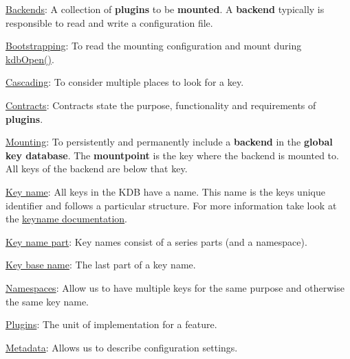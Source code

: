 \begin{DoxyItemize}
\item \hyperlink{doc_help_elektra-backends_md}{Backends}\+: A collection of {\bfseries plugins} to be {\bfseries mounted}. A {\bfseries backend} typically is responsible to read and write a configuration file.
\item \hyperlink{doc_help_elektra-bootstrapping_md}{Bootstrapping}\+: To read the mounting configuration and mount during {\ttfamily \hyperlink{group__kdb_ga844e1299a84c3fbf1d3a905c5c893ba5}{kdb\+Open()}}.
\item \hyperlink{doc_help_elektra-cascading_md}{Cascading}\+: To consider multiple places to look for a key.
\item \hyperlink{doc_help_elektra-contracts_md}{Contracts}\+: Contracts state the purpose, functionality and requirements of {\bfseries plugins}.
\item \hyperlink{doc_help_elektra-mounting_md}{Mounting}\+: To persistently and permanently include a {\bfseries backend} in the {\bfseries global key database}. The {\bfseries mountpoint} is the key where the backend is mounted to. All keys of the backend are below that key.
\item \hyperlink{doc_KEYNAMES_md}{Key name}\+: All keys in the K\+DB have a name. This name is the keys unique identifier and follows a particular structure. For more information take look at the \hyperlink{doc_KEYNAMES_md}{keyname documentation}.
\item \hyperlink{doc_KEYNAMES_md}{Key name part}\+: Key names consist of a series parts (and a namespace).
\item \hyperlink{doc_KEYNAMES_md}{Key base name}\+: The last part of a key name.
\item \hyperlink{doc_help_elektra-namespaces_md}{Namespaces}\+: Allow us to have multiple keys for the same purpose and otherwise the same key name.
\item \hyperlink{src_plugins_README_md}{Plugins}\+: The unit of implementation for a feature.
\item \hyperlink{doc_help_elektra-metadata_md}{Metadata}\+: Allows us to describe configuration settings.
\end{DoxyItemize}


